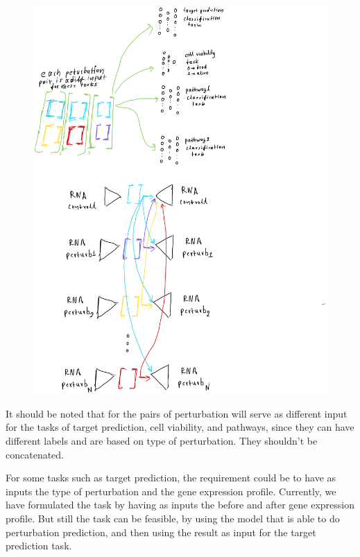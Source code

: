 \documentclass[12pt, a4paper]{article}
\begin{document}
\begin{figure}[h!]
  \centering
  \includegraphics[width=.8\textwidth]{my_multi_many_mod.PNG}
  \caption{}
  \label{}
\end{figure}

It should be noted that for the pairs of perturbation will serve as different input for the tasks of target prediction, cell viability, and pathways, since they can have different labels and are based on type of perturbation. They shouldn't be concatenated.

For some tasks such as target prediction, the requirement could be to have as inputs the type of perturbation and the gene expression profile. Currently, we have formulated the task by having as inputs the before and after gene expression profile. But still the task can be feasible, by using the model that is able to do perturbation prediction, and then using the result as input for the target prediction task. 


\clearpage



\end{document}
